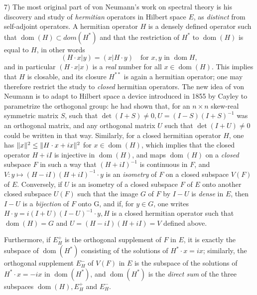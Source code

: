 \documentclass[12pt,a4paper,leqno,twoside]{extbook}
\DeclarePairedDelimiter{\norm}{\lVert}{\rVert}
\newcommand{\dom}{\operatorname{dom}}
\begin{document}
7) The most original part of von Neumann's work on spectral theory is his discovery and study of \emph{hermitian} operators in Hilbert space \(E\), as \emph{distinct} from self-adjoint operators. A hermitian operator \(H\) is a densely defined operator such that \(\dom(H) \subset dom(H^*)\) and that the restriction of \(H^*\) to \(\dom(H)\) is equal to \(H\), in other words
\begin{equation}
    \label{eq:7.38}
    (H \cdot x | y) = (x | H \cdot y) \quad \text{for } x,y \text{ in } \dom{H},
\end{equation}
and in particular \((H \cdot x|x)\) is a \emph{real} number for all \(x \in \dom(H)\). This implies that \(H\) is closable, and its closure \(H^{**}\) is again a hermitian operator; one may therefore restrict the study to \emph{closed} hermitian operators. The new idea of von Neumann is to adapt to Hilbert space a device introduced in 1855 by Cayley to parametrize the orthogonal group: he had shown that, for an \(n \times n\) skew-real symmetric matrix \(S\), such that \(\det(I+S) \neq 0, U = (I-S)(I+S)^{-1}\) was an orthogonal matrix, and any orthogonal matrix \(U\) such that \(\det(I+U) \neq 0\) could be written in that way. Similarly, for a closed hermitian operator \(H\), one has \(\norm{x}^2 \leq \norm{H \cdot x + ix}^2\) for \(x \in \dom(H)\), which implies that the closed operator \(H + iI\) is injective in \(\dom(H)\), and maps \(\dom(H)\) on a \emph{closed} subspace \(F\) in such a way that \((H+iI)^{-1}\) is continuous in \(F\), and \(V: y \mapsto (H - iI)(H + iI)^{-1} \cdot y\) is an \emph{isometry} of \(F\) on a closed subspace \(V(F)\) of \(E\). Conversely, if \(U\) is an isometry of a closed subspace \(F\) of \(E\) onto another closed subspace \(U(F)\) such that the image \(G\) of \(F\) by \(I - U\) is \emph{dense} in \(E\), then \(I-U\) is a \emph{bijection} of \(F\) onto G, and if, for \(y \in G\), one writes \(H \cdot y = i(I+U)(I-U)^{-1} \cdot y, H\) is a closed hermitian operator such that \(\dom(H) = G\) and \(U = (H-iI)(H+iI) = V\) defined above.

Furthermore, if \(E^+_H\) is the orthogonal supplement of \(F\) in \(E\), it is exactly the subspace of \(\dom(H^*)\) consisting of the solutions of \(H^* \cdot x = ix\); similarly, the orthogonal supplement \(E^-_H\) of \(V(F)\) in \(E\) is the subspace of the solutions of \(H^* \cdot x = -ix\) in \(\dom(H^*)\), and \(\dom(H^*)\) is the \emph{direct sum} of the three subspaces \(\dom(H), E^+_H\) and \(E^-_H\).
\end{document}
